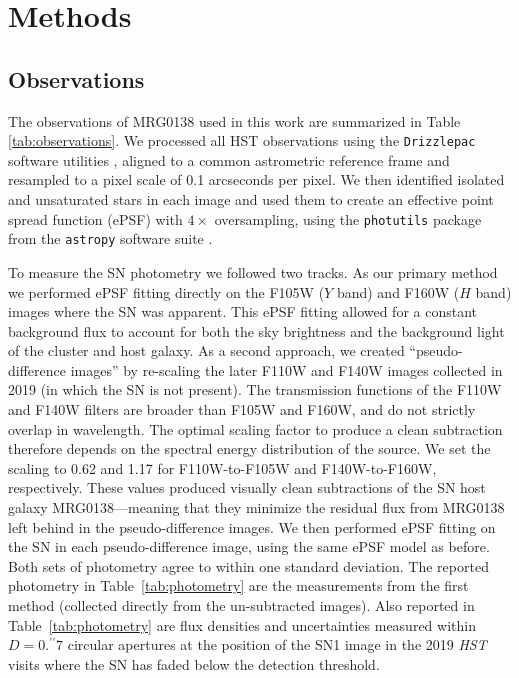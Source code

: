 \documentclass[12pt]{article}
\begin{document}


\section*{Methods}


\subsection*{Observations} %

The observations of MRG0138 used in this work are  summarized in Table \ref{tab:observations}.   We processed all HST observations using the {\tt Drizzlepac} software utilities \cite{gonzaga_drizzlepac_2012}, aligned to a common astrometric reference frame and resampled to a pixel scale of 0.1 arcseconds per pixel.  We then identified isolated and unsaturated stars in each image and used them to create an effective point spread function (ePSF) with $4\times$ oversampling, using the {\tt photutils} package from the {\tt astropy} software suite \cite{the_astropy_collaboration_astropy_2018}.   

To measure the SN photometry we followed two tracks.  As our primary method we performed ePSF fitting directly on the F105W ($Y$ band) and F160W ($H$ band) images where the SN was apparent.  This ePSF fitting allowed for a constant background flux to account for both the sky brightness and the background light of the cluster and host galaxy.  
As a second approach, we created ``pseudo-difference images'' by re-scaling the later F110W and F140W images collected in 2019 (in which the SN is not present).  The transmission functions of the F110W and F140W filters are broader than F105W and F160W, and do not strictly overlap in wavelength.  The optimal scaling factor to produce a clean subtraction therefore depends on the spectral energy distribution of the source.  We set the scaling to 0.62 and 1.17 for F110W-to-F105W and F140W-to-F160W, respectively.  These values produced visually clean subtractions of the SN host galaxy MRG0138---meaning that they minimize the residual flux from MRG0138 left behind in the pseudo-difference images.  We then performed ePSF fitting on the SN in each pseudo-difference image, using the same ePSF model as before.   Both sets of photometry agree to within one standard deviation.  The reported photometry in Table~\ref{tab:photometry} are the measurements from the first method (collected directly from the un-subtracted images).  Also reported in Table~\ref{tab:photometry} are flux densities and uncertainties measured within $D=0.^{\prime\prime}7$ circular apertures at the position of the SN1 image in the 2019 \textit{HST} visits where the SN has faded below the detection threshold.
\end{document}
